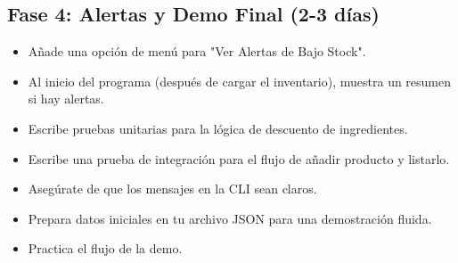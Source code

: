 \documentclass{article}
\begin{document}
	\subsection{Fase 4: Alertas y Demo Final (2-3 días)}
		\begin{itemize}
			\item Añade una opción de menú para "Ver Alertas de Bajo Stock".
			\item Al inicio del programa (después de cargar el inventario), muestra un resumen si hay alertas.
		\end{itemize}
		\begin{itemize}
			\item Escribe pruebas unitarias para la lógica de descuento de ingredientes.
			\item Escribe una prueba de integración para el flujo de añadir producto y listarlo.
		\end{itemize}
		\begin{itemize}
			\item Asegúrate de que los mensajes en la CLI sean claros.
			\item Prepara datos iniciales en tu archivo JSON para una demostración fluida.
			\item Practica el flujo de la demo.
		\end{itemize}
	
\end{document}
